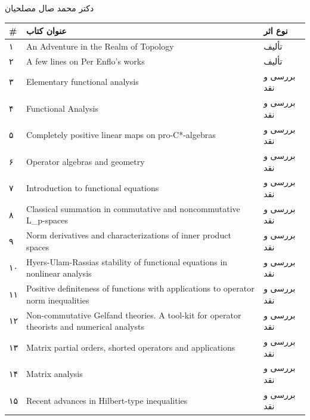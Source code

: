 \documentclass[
  letterpaper,
  DIV=11,
  numbers=noendperiod]{scrreprt}
\newcounter{none} %
\begin{document}
دکتر محمد صال مصلحیان

{\def\LTcaptype{none} %
\begin{longtable}[]{@{}
  >{\raggedright\arraybackslash}p{}
  >{\raggedright\arraybackslash}p{}
  >{\raggedright\arraybackslash}p{}@{}}
\toprule\noalign{}
\begin{minipage}[b]{\linewidth}\raggedright
\#
\end{minipage} & \begin{minipage}[b]{\linewidth}\raggedright
عنوان کتاب
\end{minipage} & \begin{minipage}[b]{\linewidth}\raggedright
نوع اثر
\end{minipage} \\
\midrule\noalign{}
\endhead
\bottomrule\noalign{}
\endlastfoot
۱ & An Adventure in the Realm of Topology & تألیف \\
۲ & A few lines on Per Enflo's works & تألیف \\
۳ & Elementary functional analysis & بررسی و نقد \\
۴ & Functional Analysis & بررسی و نقد \\
۵ & Completely positive linear maps on pro-C*-algebras & بررسی و نقد \\
۶ & Operator algebras and geometry & بررسی و نقد \\
۷ & Introduction to functional equations & بررسی و نقد \\
۸ & Classical summation in commutative and noncommutative L\_p-spaces &
بررسی و نقد \\
۹ & Norm derivatives and characterizations of inner product spaces &
بررسی و نقد \\
۱۰ & Hyers-Ulam-Rassias stability of functional equations in nonlinear
analysis & بررسی و نقد \\
۱۱ & Positive definiteness of functions with applications to operator
norm inequalities & بررسی و نقد \\
۱۲ & Non-commutative Gelfand theories. A tool-kit for operator theorists
and numerical analysts & بررسی و نقد \\
۱۳ & Matrix partial orders, shorted operators and applications & بررسی و
نقد \\
۱۴ & Matrix analysis & بررسی و نقد \\
۱۵ & Recent advances in Hilbert-type inequalities & بررسی و نقد \\

\end{longtable}}
\end{document}
